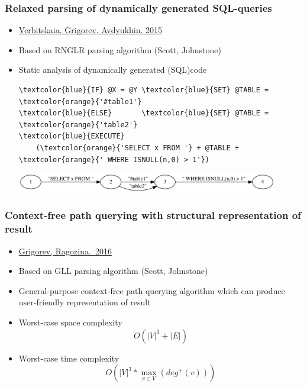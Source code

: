 \documentclass[xcolor=table]{beamer}
\begin{document}
\begin{frame}[fragile]
  \transwipe[direction=90]
  \frametitle{Relaxed parsing of dynamically generated SQL-queries}
  \begin{itemize}
    \item \href{https://link.springer.com/chapter/10.1007/978-3-319-41579-6\_22}{Verbitskaia, Grigorev, Avdyukhin. 2015}
    \item Based on RNGLR parsing algorithm (Scott, Johnstone)
    \item Static analysis of dynamically generated (SQL)code

        \begin{Verbatim}[commandchars=\\\{\}]
\textcolor{blue}{IF} @X = @Y \textcolor{blue}{SET} @TABLE = \textcolor{orange}{'#table1'}
\textcolor{blue}{ELSE}       \textcolor{blue}{SET} @TABLE = \textcolor{orange}{'table2'}
\textcolor{blue}{EXECUTE} 
    (\textcolor{orange}{'SELECT x FROM '} + @TABLE + \textcolor{orange}{' WHERE ISNULL(n,0) > 1'})
        \end{Verbatim}
     \centering{\huge{$ \Downarrow $}}
                \includegraphics[width = 0.9\textwidth]{pictures/approximation1.pdf} \\
      
  \end{itemize}
\end{frame}

\begin{frame}
  \transwipe[direction=90]
  \frametitle{Context-free path querying with structural representation of result}
  \begin{itemize}
    \item \href{https://arxiv.org/abs/1612.08872}{Grigorev, Ragozina.~2016}
    \item Based on GLL parsing algorithm (Scott, Johnstone)
    \item General-purpose context-free path querying algorithm which can produce user-friendly representation of result
    \item Worst-case space complexity $$O(|V|^3 + |E|)$$
    \item Worst-case time complexity $$O\left(|V|^3*\max\limits_{v \in V}\left(deg^+\left(v\right)\right)\right)$$
  \end{itemize}
\end{frame}
\end{document}
